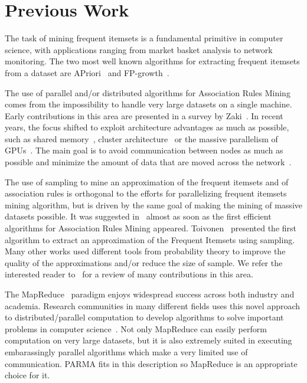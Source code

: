 \section{Previous Work}
\label{sec:parmarelated}

The task of mining frequent itemsets is a fundamental primitive in computer
science, with applications ranging from market basket analysis to network
monitoring. The two most well known algorithms for extracting frequent itemsets
from a dataset are APriori~\cite{AgrawalS94} and FP-growth~\cite{HanPY00}.

The use of parallel and/or distributed algorithms for Association Rules Mining comes from the
impossibility to handle very large datasets on a single machine. Early
contributions in this area are presented in a survey by Zaki~\cite{Zaki99}.
In recent years, the focus shifted to exploit architecture advantages as much as
possible, such as shared memory~\cite{JinYA05}, cluster
architecture~\cite{BuehrerPTKS07} or the massive parallelism of
GPUs~\cite{FangEtAl08}. The main goal is to avoid communication
between nodes as much as possible and minimize the amount of data that are moved
across the 
network~\cite{CongHHP05,EHZaiane06,LiuLZT07,OzkuralUA11}.

The use of sampling to mine an approximation of the frequent itemsets and of
association rules is orthogonal to the efforts for parallelizing frequent
itemsets mining algorithm, but is driven by the same goal of making the mining
of massive datasets possible. It was suggested in~\cite{MannilaTV94} almost as soon as the
first efficient algorithms for Association Rules Mining appeared.
Toivonen~\cite{Toivonen96} presented the first algorithm to extract an
approximation of the Frequent Itemsets using sampling. Many other works used different tools
from probability theory to improve the quality of the approximations and/or
reduce the size of sample. We refer the interested reader
to~\cite{RiondatoU12} for a review of many contributions in this area.

The MapReduce~\cite{DeanG08} paradigm enjoys widespread success
across both industry and academia. Research communities in many different
fields uses this novel approach to distributed/parallel computation to develop
algorithms to solve important problems in computer
science~\cite{ChierichettiKT10,ChuKLYBNO06,GoodrichSZ11,LinS10,PietracaprinaPRSU12}.
Not only MapReduce can easily perform computation on very large datasets, but it
is also extremely suited in executing embarassingly parallel algorithms which
make a very limited use of communication. PARMA fits in this description so
MapReduce is an appropriate choice for it.

